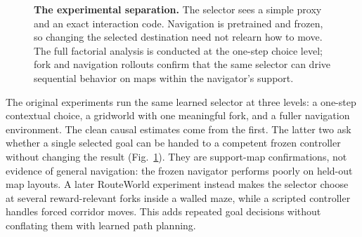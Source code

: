 \documentclass[11pt,a4paper]{article}
\newcommand{\fig}[1]{Fig.~\ref{#1}}
\begin{document}
\begin{figure}[!htbp]
  \centering
  \caption{\textbf{The experimental separation.} The selector sees a simple proxy and an exact interaction code. Navigation is pretrained and frozen, so changing the selected destination need not relearn how to move. The full factorial analysis is conducted at the one-step choice level; fork and navigation rollouts confirm that the same selector can drive sequential behavior on maps within the navigator's support.}
  \label{fig:forkworld}
\end{figure}

The original experiments run the same learned selector at three levels: a one-step contextual choice, a gridworld with one meaningful fork, and a fuller navigation environment. The clean causal estimates come from the first. The latter two ask whether a single selected goal can be handed to a competent frozen controller without changing the result (\fig{fig:forkworld}). They are support-map confirmations, not evidence of general navigation: the frozen navigator performs poorly on held-out map layouts. A later RouteWorld experiment instead makes the selector choose at several reward-relevant forks inside a walled maze, while a scripted controller handles forced corridor moves. This adds repeated goal decisions without conflating them with learned path planning.
\end{document}

